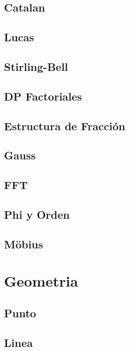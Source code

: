 \documentclass[a4paper,10pt,landscape,twocolumn]{article}
\begin{document}
\subsection{Catalan}

\subsection{Lucas}

\subsection{Stirling-Bell}

\subsection{DP Factoriales}

\subsection{Estructura de Fracción}

\subsection{Gauss}

\subsection{FFT}

\subsection{Phi y Orden}

\subsection{Möbius}


\section{Geometria} %
\subsection{Punto}

\subsection{Linea}

\end{document}
